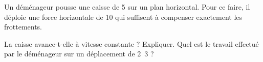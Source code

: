 

\begin{exercice}\label{exo016}

Un déménageur pousse une caisse de \unit{5}{\kilo\gram} sur un plan horizontal. Pour ce faire, il déploie une force horizontale de \unit{10}{\newton} qui suffisent à compenser exactement les frottements.

La caisse avance-t-elle à vitesse constante ? Expliquer. Quel est le travail effectué par le déménageur sur un déplacement de \unit{2.3}{\meter} ?

\end{exercice}
